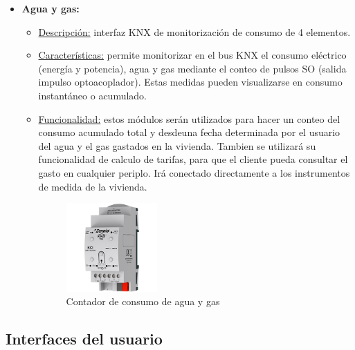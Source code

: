 \begin{itemize}
\item \textbf{Agua y gas:} 
	\begin{itemize}
	\item\underline{Descripción:} interfaz KNX de monitorización de consumo de 4 elementos.
	\item \underline{Características:} permite monitorizar en el bus KNX el consumo eléctrico (energía y potencia), agua y gas mediante el conteo de pulsos SO (salida impulso optoacoplador). Estas medidas pueden visualizarse en consumo instantáneo o acumulado.
	\item \underline{Funcionalidad:} estos módulos serán utilizados para hacer un conteo del consumo acumulado total y desdeuna fecha determinada por el usuario del agua y el gas gastados en la vivienda. Tambien se utilizará su funcionalidad de calculo de tarifas, para que el cliente pueda consultar el gasto en cualquier periplo. Irá conectado directamente a los instrumentos de medida de la vivienda.
	\begin{figure}[H]
	\centering
	\includegraphics[width=0.35\textwidth]{figures/contador_agua.png}   
	\caption{Contador de consumo de agua y gas}
	\label{fig:contador_agua}
	\end{figure}
	\end{itemize} 
\end{itemize} 

\subsection{Interfaces del usuario}

